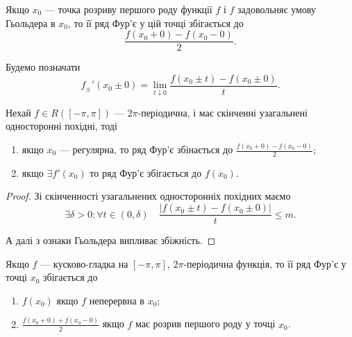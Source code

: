 \begin{corollary}
    Якщо $x_0$ --- точка розриву першого роду функції $f$ і $f$ задовольняє умову Гьольдера в $x_0$, то її ряд Фур'є у цій точці збігається до
    \begin{equation}
        \frac{f(x_0 + 0) - f(x_0 - 0)}{2}.
    \end{equation}
\end{corollary}

Будемо позначати
\begin{equation}
    f_\pm'(x_0 \pm 0) = \lim_{t \downarrow 0} \frac{f(x_0 \pm t) - f(x_0 \pm 0)}{t}.
\end{equation}

\begin{theorem}
    Нехай $f \in R([-\pi, \pi])$ --- $2\pi$-періодична, і має скінченні узагальнені односторонні похідні, тоді
    \begin{enumerate}
        \item якщо $x_0$ --- регулярна, то ряд Фур'є збінається до $\frac{f(x_0 + 0) - f(x_0 - 0)}{2}$;
        \item якщо $\exists f'(x_0)$ то ряд Фур'є збігається до $f(x_0)$.
    \end{enumerate}
\end{theorem}
\begin{proof}
    Зі скінченності узагальнених односторонніх похідних маємо
    \begin{equation}
        \exists \delta > 0: \forall t \in (0, \delta) \quad \frac{|f(x_0 \pm t) - f(x_0 \pm 0)|}{t} \le m.
    \end{equation}
    
    А далі з ознаки Гьольдера випливає збіжність.
\end{proof}

\begin{theorem}
    Якщо $f$ --- кусково-гладка на $[-\pi,\pi]$, $2\pi$-періодична функція, то її ряд Фур'є у точці $x_0$ збігається до 
    \begin{enumerate}
        \item $f(x_0)$ якщо $f$ неперервна в $x_0$;
        \item $\frac{f(x_0 + 0) + f(x_0 - 0)}{2}$ якщо $f$ має розрив першого роду у точці $x_0$.
    \end{enumerate}
\end{theorem}


